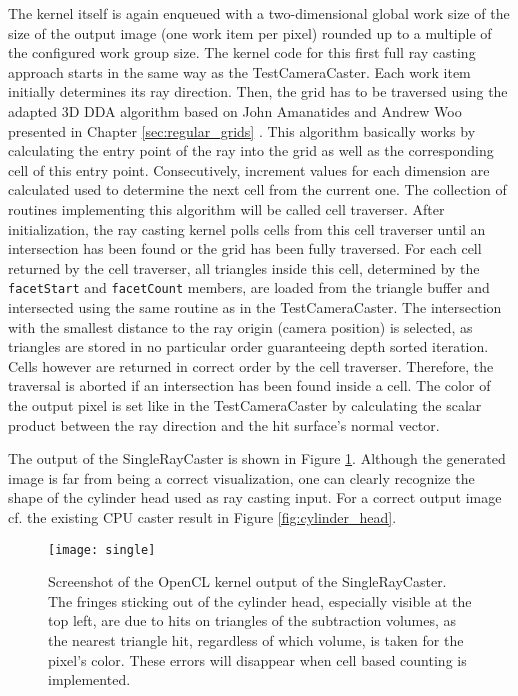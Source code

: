 The kernel itself is again enqueued with a two-dimensional global work size of the size of the output image (one work item per pixel) rounded up to a multiple of the configured work group size. The kernel code for this first full ray casting approach starts in the same way as the TestCameraCaster. Each work item initially determines its ray direction. Then, the grid has to be traversed using the adapted 3D DDA algorithm based on John Amanatides and Andrew Woo presented in Chapter \ref{sec:regular_grids} \cite{3DDDA}. This algorithm basically works by calculating the entry point of the ray into the grid as well as the corresponding cell of this entry point. Consecutively, increment values for each dimension are calculated used to determine the next cell from the current one. The collection of routines implementing this algorithm will be called cell traverser. After initialization, the ray casting kernel polls cells from this cell traverser until an intersection has been found or the grid has been fully traversed. For each cell returned by the cell traverser, all triangles inside this cell, determined by the \lstinline!facetStart! and \lstinline!facetCount! members, are loaded from the triangle buffer and intersected using the same routine as in the TestCameraCaster. The intersection with the smallest distance to the ray origin (camera position) is selected, as triangles are stored in no particular order guaranteeing depth sorted iteration. Cells however are returned in correct order by the cell traverser. Therefore, the traversal is aborted if an intersection has been found inside a cell. The color of the output pixel is set like in the TestCameraCaster by calculating the scalar product between the ray direction and the hit surface's normal vector.

The output of the SingleRayCaster is shown in Figure \ref{fig:single}. Although the generated image is far from being a correct visualization, one can clearly recognize the shape of the cylinder head used as ray casting input. For a correct output image cf. the existing CPU caster result in Figure \ref{fig:cylinder_head}.

\begin{figure}
\centering
\texttt{[image: single]}
\caption{Screenshot of the OpenCL kernel output of the SingleRayCaster. The fringes sticking out of the cylinder head, especially visible at the top left, are due to hits on triangles of the subtraction volumes, as the nearest triangle hit, regardless of which volume, is taken for the pixel's color. These errors will disappear when cell based counting is implemented.}
\label{fig:single}
\end{figure}


